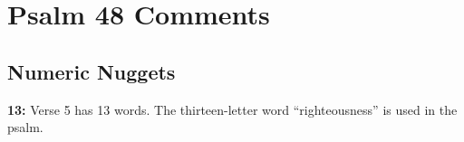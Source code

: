 \section{Psalm 48 Comments}

\subsection{Numeric Nuggets}
\textbf{13:} Verse 5 has 13 words. The thirteen-letter word ``righteousness''  is used in the psalm.